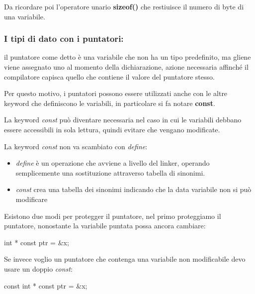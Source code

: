 \documentclass[
]{article}
\newenvironment{Shaded}{}{}
\newcommand{\DataTypeTok}[1]{\textcolor[rgb]{0.56,0.13,0.00}{#1}}
\newcommand{\NormalTok}[1]{#1}
\begin{document}
Da ricordare poi l'operatore unario \textbf{sizeof()} che restiuisce il
numero di byte di una variabile.

\hypertarget{header-n696}{%
\subsubsection{I tipi di dato con i puntatori:}\label{header-n696}}

il puntatore come detto è una variabile che non ha un tipo predefinito,
ma gliene viene assegnato uno al momento della dichiarazione, azione
necessaria affinché il compilatore capisca quello che contiene il valore
del puntatore stesso.

Per questo motivo, i puntatori possono essere utilizzati anche con le
altre keyword che definiscono le variabili, in particolare si fa notare
\textbf{const}.

La keyword \emph{const} può diventare necessaria nel caso in cui le
variabili debbano essere accessibili in sola lettura, quindi evitare che
vengano modificate.

La keyword \emph{const} non va scambiato con \emph{define}:

\begin{itemize}
\item
  \emph{define} è un operazione che avviene a livello del linker,
  operando semplicemente una sostituzione attraverso tabella di
  sinonimi.
\item
  \emph{const} crea una tabella dei sinonimi indicando che la data
  variabile non si può modificare
\end{itemize}

Esistono due modi per protegger il puntatore, nel primo proteggiamo il
puntatore, nonostante la variabile puntata possa ancora cambiare:

\begin{Shaded}
\begin{Highlighting}[]
\DataTypeTok{int}\NormalTok{ * }\DataTypeTok{const}\NormalTok{ ptr = \&x; }
\end{Highlighting}
\end{Shaded}

Se invece voglio un puntatore che contenga una variabile non
modificabile devo usare un doppio \emph{const}:

\begin{Shaded}
\begin{Highlighting}[]
\DataTypeTok{const} \DataTypeTok{int}\NormalTok{ * }\DataTypeTok{const}\NormalTok{ ptr = \&x;}
\end{Highlighting}
\end{Shaded}
\end{document}
